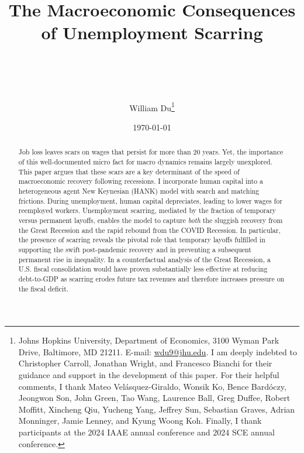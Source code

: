 


\begin{titlepage}
	\title{\textbf{The Macroeconomic Consequences of Unemployment Scarring}  %
		\author{
	William Du\thanks{ Johns Hopkins University, Department of Economics, 3100 Wyman Park Drive, Baltimore, MD 21211.
E-mail: \href{wdu9@jhu.edu}{wdu9@jhu.edu}. I am deeply indebted to Christopher Carroll, Jonathan Wright, and Francesco Bianchi for their guidance and support in the development of this paper. For their helpful comments, I thank Mateo Vel\'{a}squez-Giraldo, Wonsik Ko, Bence Bard\'{o}czy, Jeongwon Son, John Green, Tao Wang, Laurence Ball, Greg Duffee, Robert Moffitt, Xincheng Qiu, Yucheng Yang, Jeffrey Sun, Sebastian Graves,  Adrian Monninger, Jamie Lenney, and Kyung Woong Koh. Finally, I thank participants at the 2024 IAAE annual conference and 2024 SCE annual conference. }} \\ }
	\date{\today }
	\maketitle
	\begin{abstract}
	\begin{singlespace}
		\noindent  Job loss leaves scars on wages that persist for more than 20 years. Yet, the importance of this well-documented micro fact for macro dynamics remains largely unexplored. This paper argues that these scars are a key determinant of the speed of macroeconomic recovery following recessions. I incorporate human capital into a heterogeneous agent New Keynesian (HANK) model with search and matching frictions. During unemployment, human capital depreciates, leading to lower wages for reemployed workers. Unemployment scarring, mediated by the fraction of temporary versus permanent layoffs, enables the model to capture \textit{both} the sluggish recovery from the Great Recession and the rapid rebound from the COVID Recession. In particular, the presence of scarring reveals the pivotal role that temporary layoffs fulfilled in supporting the swift post-pandemic recovery and in preventing a subsequent permanent rise in inequality. In a counterfactual analysis of the Great Recession, a U.S. fiscal consolidation would have proven substantially less effective at reducing debt-to-GDP as scarring erodes future tax revenues and therefore increases pressure on the fiscal deficit.

  
\end{singlespace}
\medskip
	
	\end{abstract}

\end{titlepage}

